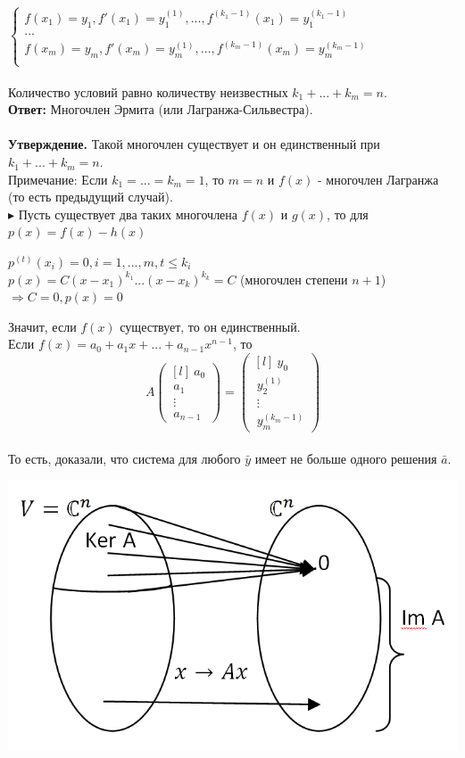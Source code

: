 \documentclass[12pt]{article}
\theoremstyle{definition}
\numberwithin{equation}{section}
\begin{document}
	$  
	\left\{  
	\begin{array}{lcl}  
	f(x_1) = y_1, f'(x_1) = y_1^{(1)},...,f^{(k_1-1)}(x_1) = y_1^{(k_1-1)} \\  
	...\\
	f(x_m) = y_m, f'(x_m) = y_m^{(1)},...,f^{(k_m-1)}(x_m) = y_m^{(k_m-1)} \\
	\end{array}   
	\right.  
	$
	\\ \\
	Количество условий равно количеству неизвестных $k_1+...+k_m = n$.\\
	\textbf{Ответ:} Многочлен Эрмита (или Лагранжа-Сильвестра).\\
	\\
	\noindent \textbf{Утверждение.}
	Такой многочлен существует и он единственный при $k_1+...+k_m = n$.\\
	Примечание: Если $k_1 = ... = k_m = 1$, то $m = n$ и $f(x)$ - многочлен Лагранжа (то есть предыдущий случай).\\
	$\blacktriangleright$
	Пусть существует два таких многочлена $f(x)$ и $g(x)$, то для $p(x) = f(x)-h(x)$
	\begin{center}
		$p^{(t)}(x_i) = 0, i=1,...,m, t\leq k_i$\\
		$p(x) = C(x-x_1)^{k_1}...(x-x_k)^{k_k} = C$ (многочлен степени $n+1$)\\
		$\Rightarrow C = 0, p(x) = 0$
	\end{center}
	Значит, если $f(x)$ существует, то он единственный.\\
	Если $f(x) = a_0+a_1x+...+a_{n-1}x^{n-1}$, то \\
	\[A \begin{pmatrix}[l]
	~a_0 \\
	~a_1 \\
	~\vdots\\
	~a_{n-1}
	\end{pmatrix} = \begin{pmatrix}[l]
	~y_0 \\
	~y_2^{(1)}\\
	~\vdots\\
	~y_m^{(k_m-1)}
	\end{pmatrix}\]\\
	То есть, доказали, что система для любого $\bar y$ имеет не больше одного решения $\bar a$.\begin{center}
		\includegraphics[scale=0.4]{l3_2.png}\end{center}
\end{document}

